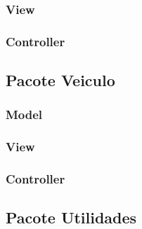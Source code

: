 \subsubsection{View}



\subsubsection{Controller}



\subsection{Pacote Veiculo}

\subsubsection{Model}



\subsubsection{View}



\subsubsection{Controller}



\subsection{Pacote Utilidades}



